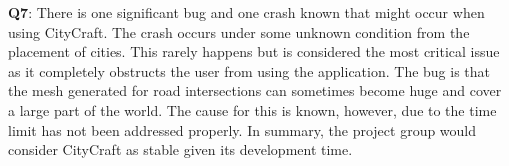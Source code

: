 \textbf{Q7}:
There is one significant bug and one crash known that might occur when using CityCraft.
The crash occurs under some unknown condition from the placement of cities.
This rarely happens but is considered the most critical issue as it completely obstructs the user from using the application.
The bug is that the mesh generated for road intersections can sometimes become huge and cover a large part of the world.
The cause for this is known, however, due to the time limit has not been addressed properly.
In summary, the project group would consider CityCraft as stable given its development time.
